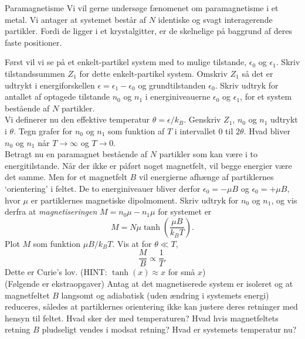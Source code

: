 \begin{opgave}{Paramagnetisme}
    Vi vil gerne undersøge fænomenet om paramagnetisme i et metal. Vi antager at systemet består af $N$ identiske og svagt interagerende partikler. Fordi de ligger i et krystalgitter, er de skelnelige på baggrund af deres faste positioner.
    
    Først vil vi se på et enkelt-partikel system med to mulige tilstande, $\epsilon_0$ og $\epsilon_1$.
    \opg Skriv tilstandssummen $Z_1$ for dette enkelt-partikel system.
    \opg Omskriv $Z_1$ så det er udtrykt i energiforskellen $\epsilon=\epsilon_1-\epsilon_0$ og grundtilstanden $\epsilon_0$.
    \opg Skriv udtryk for antallet af optagede tilstande $n_0$ og $n_1$ i energiniveauerne $\epsilon_0$ og $\epsilon_1$, for et system bestående af $N$ partikler.\\[12pt]
    Vi definerer nu den effektive temperatur $\theta=\epsilon/k_B$.
    \opg Genskriv $Z_1$, $n_0$ og $n_1$ udtrykt i $\theta$.
    \opg Tegn grafer for $n_0$ og $n_1$ som funktion af $T$ i intervallet $0$ til $2\theta$. Hvad bliver $n_0$ og $n_1$ når $T\to\infty$ og $T\to 0$.\\[12pt]
    Betragt nu en paramagnet bestående af $N$ partikler som kan være i to energitilstande. Når der ikke er påført noget magnetfelt, vil begge energier være det samme. Men for et magnetfelt $B$ vil energierne afhænge af partiklernes `orientering' i feltet. De to energiniveauer bliver derfor $\epsilon_0=-\mu B$ og $\epsilon_0=+\mu B$, hvor $\mu$ er partiklernes magnetiske dipolmoment.
    \opg Skriv udtryk for $n_0$ og $n_1$, og vis derfra at \emph{magnetiseringen} $M=n_0\mu-n_1\mu$ for systemet er
    \[ M=N\mu\tanh\left(\frac{\mu B}{k_B T}\right).\]
    \opg Plot $M$ som funktion $\mu B/k_BT$.
    \opg Vis at for $\theta\ll T$,
    \[\frac{M}{B}\propto\frac{1}{T}.\]
    Dette er Curie's lov. (HINT: $\tanh(x)\approx x$ for små $x$) \\[12pt]
    (Følgende er ekstraopgaver)
    \opg Antag at det magnetiserede system er isoleret og at magnetfeltet $B$ langsomt og adiabatisk (uden ændring i systemets energi) reduceres, således at partiklernes orientering ikke kan justere deres retninger med hensyn til feltet. Hvad sker der med temperaturen?
    \opg Hvad hvis magnetfeltets retning $B$ pludseligt vendes i modsat retning? Hvad er systemets temperatur nu?
\end{opgave}

